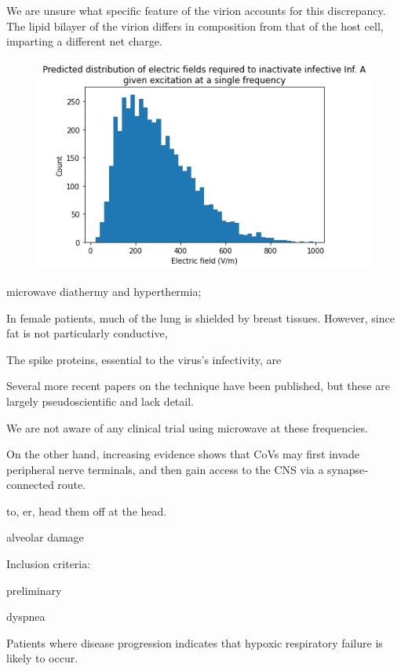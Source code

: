 \documentclass[fleqn,10pt]{paper}
\begin{document}
We are unsure what specific feature of the virion accounts for this discrepancy. The lipid bilayer of the virion differs in composition from that of the host cell, imparting a different net charge.


\begin{figure}[H]
	\centering
	\includegraphics[width=\textwidth]{biology/output_35_1.png}
\end{figure}



microwave diathermy and hyperthermia; 

In female patients, much of the lung is shielded by breast tissues. However, since fat is not particularly conductive, 

The spike proteins, essential to the virus's infectivity, are 


Several more recent papers \cite{Theoretical2020} on the technique have been published, but these are largely pseudoscientific and lack detail. 

We are not aware of any clinical trial using microwave at these frequencies.



On the other hand, increasing evidence
shows that CoVs may first invade peripheral nerve terminals, and
then gain access to the CNS via a synapse‐connected route.

to, er, head them off at the head.

alveolar damage



Inclusion criteria:

preliminary

dyspnea

Patients where disease progression indicates that hypoxic respiratory failure is likely to occur.
\end{document}
